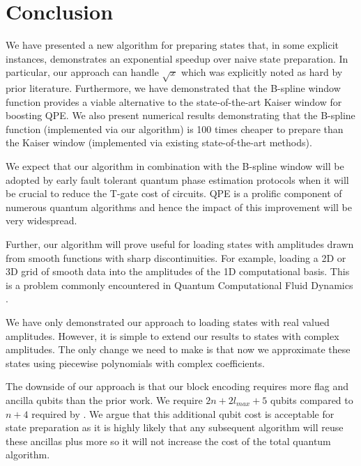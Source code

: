 \documentclass[aps,prx,twocolumn,floatfix,10pt,amssymb,amsfont,amsmath,superscriptaddress,float,nofootinbib,longbibliography,nobalancelastpage]{revtex4-2}
\theoremstyle{empty}
\begin{document}
\section{Conclusion}
We have presented a new algorithm for preparing states that, in some explicit instances, demonstrates an exponential speedup over naive state preparation. In particular, our approach can handle $\sqrt{x}$ which was explicitly noted as hard by prior literature. Furthermore, we have demonstrated that the B-spline window function provides a viable alternative to the state-of-the-art Kaiser window for boosting QPE. We also present numerical results demonstrating that the B-spline function (implemented via our algorithm) is 100 times cheaper to prepare than the Kaiser window (implemented via existing state-of-the-art methods).

We expect that our algorithm in combination with the B-spline window will be adopted by early fault tolerant quantum phase estimation protocols when it will be crucial to reduce the T-gate cost of circuits. QPE is a prolific component of numerous quantum algorithms and hence the impact of this improvement will be very widespread.

Further, our algorithm will prove useful for loading states with amplitudes drawn from smooth functions with sharp discontinuities. For example, loading a 2D or 3D grid of smooth data into the amplitudes of the 1D computational basis. This is a problem commonly encountered in Quantum Computational Fluid Dynamics \cite{Lapworth:2022rcw}.

We have only demonstrated our approach to loading states with real valued amplitudes. However, it is simple to extend our results to states with complex amplitudes. The only change we need to make is that now we approximate these states using piecewise polynomials with complex coefficients. 

The downside of our approach is that our block encoding requires more flag and ancilla qubits than the prior work. We require $2n +2l_{max} +5$ qubits compared to $n+4$ required by \cite{mcardleQuantumStatePreparation2022}. We argue that this additional qubit cost is acceptable for state preparation as it is highly likely that any subsequent algorithm will reuse these ancillas plus more so it will not increase the cost of the total quantum algorithm.
\end{document}

